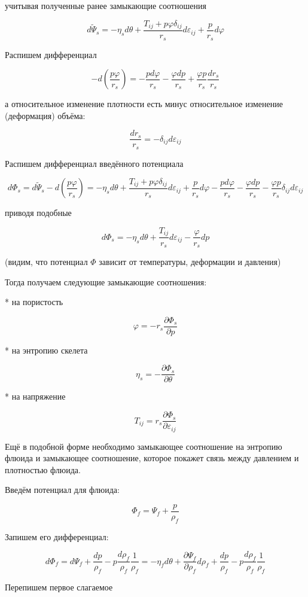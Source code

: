 \documentclass[main.tex]{subfiles}
\begin{document}
учитывая полученные ранее замыкающие соотношения

$$d\tilde{\Psi}_s=-\eta_s d\theta+\frac{T_{ij}+p\varphi\delta_{ij}}{r_s}d\varepsilon_{ij}+\frac{p}{r_s}d\varphi$$

Распишем дифференциал

$$-d\left(\frac{p\varphi}{r_s}\right)=-\frac{p d\varphi}{r_s}-\frac{\varphi dp}{r_s}+\frac{\varphi p}{r_s}\frac{dr_s}{r_s}$$

а относительное изменение плотности есть минус относительное изменение (деформация) объёма:

$$\frac{dr_s}{r_s}=-\delta_{ij}d\varepsilon_{ij}$$

Распишем дифференциал введённого потенциала

$$d\Phi_s=d\tilde{\Psi}_s-d\left(\frac{p\varphi}{r_s}\right)=-\eta_s d\theta+\frac{T_{ij}+p\varphi\delta_{ij}}{r_s}d\varepsilon_{ij}+\frac{p}{r_s}d\varphi-\frac{p d\varphi}{r_s}-\frac{\varphi dp}{r_s}-\frac{\varphi p}{r_s}\delta_{ij}d\varepsilon_{ij}$$

приводя подобные

$$d\Phi_s=-\eta_s d\theta+\frac{T_{ij}}{r_s}d\varepsilon_{ij}-\frac{\varphi}{r_s}dp$$

(видим, что потенциал $\Phi$ зависит от температуры, деформации и давления)

Тогда получаем следующие замыкающие соотношения:

* на пористость

$$\varphi=-r_s\frac{\partial\Phi_s}{\partial p}$$

* на энтропию скелета

$$\eta_s=-\frac{\partial\Phi_s}{\partial\theta}$$

* на напряжение

$$T_{ij}=r_s\frac{\partial\Phi_s}{\partial\varepsilon_{ij}}$$

Ещё в подобной форме необходимо замыкающее соотношение на энтропию флюида и замыкающее соотношение, которое покажет связь между давлением и плотностью флюида.

Введём потенциал для флюида:

$$\Phi_f=\Psi_f+\frac{p}{\rho_f}$$

Запишем его дифференциал:

$$d\Phi_f=d\Psi_f+\frac{dp}{\rho_f}-p\frac{d\rho_f}{\rho_f}\frac{1}{\rho_f}=-\eta_f d\theta+\frac{\partial\Psi_{\!f}}{\partial\rho_f}d\rho_f+\frac{dp}{\rho_f}-p\frac{d\rho_f}{\rho_f}\frac{1}{\rho_f}$$

Перепишем первое слагаемое
\end{document}

